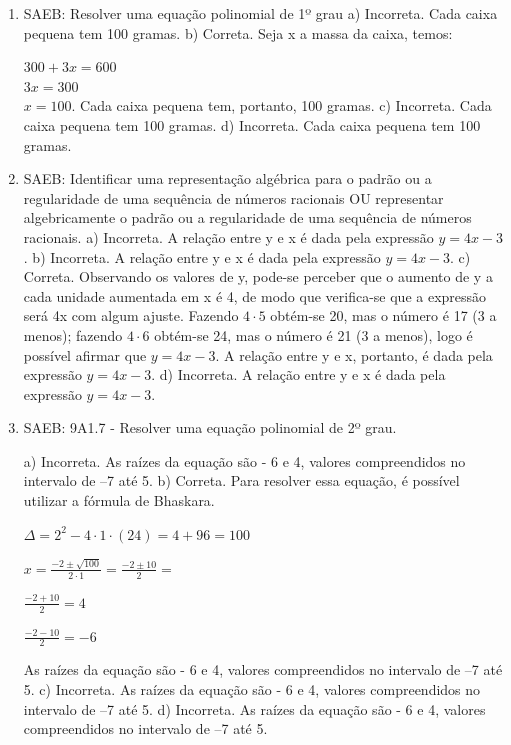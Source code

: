 \begin{enumerate}
\item
SAEB: Resolver uma equação polinomial de 1º grau
a) Incorreta. Cada caixa pequena tem 100 gramas.
b) Correta. Seja x a massa da caixa, temos:

$300 + 3x = 600$ \\

$3x = 300$ \\

$x = 100$. Cada caixa pequena tem, portanto, 100 gramas.
c) Incorreta. Cada caixa pequena tem 100 gramas.
d) Incorreta. Cada caixa pequena tem 100 gramas.

\item
SAEB: Identificar uma representação algébrica para o padrão ou
a regularidade de uma sequência de números racionais OU representar
algebricamente o padrão ou a regularidade de uma sequência de números
racionais.
a) Incorreta. A relação entre y e x é dada pela expressão $y = 4x - 3$.
b) Incorreta. A relação entre y e x é dada pela expressão $y = 4x - 3$.
c) Correta. Observando os valores de y, pode-se perceber que o aumento 
de y a cada unidade aumentada em x é 4, de modo que verifica-se que a
expressão será 4x com algum ajuste. Fazendo $4 \cdot 5$ obtém-se 20, mas o 
número é 17 (3 a menos); fazendo $4 \cdot 6$ obtém-se 24, mas o número é 21
(3 a menos), logo é possível afirmar que $y = 4x - 3$. A relação entre y e
x, portanto, é dada pela expressão $y = 4x - 3$.
d) Incorreta. A relação entre y e x é dada pela expressão $y = 4x - 3$.

\item
SAEB: 9A1.7 - Resolver uma equação polinomial de 2º grau.

a) Incorreta. As raízes da equação são - 6 e 4, valores compreendidos no 
intervalo de --7 até 5.
b) Correta. Para resolver essa equação, é possível utilizar a fórmula de Bhaskara.

$\Delta = 2^{2} - 4 \cdot 1 \cdot (24) = 4 + 96 = 100$

$x = \frac{-2 \pm \sqrt{100}}{2 \cdot 1} = \frac{- 2 \pm 10}{2} =$

$\frac{-2+10}{2} = 4$

$\frac{-2-10}{2} = -6 $

As raízes da equação são - 6 e 4, valores compreendidos no intervalo 
de --7 até 5.
c) Incorreta. As raízes da equação são - 6 e 4, valores compreendidos no 
intervalo de --7 até 5.
d) Incorreta. As raízes da equação são - 6 e 4, valores compreendidos no 
intervalo de --7 até 5.


\end{enumerate}
